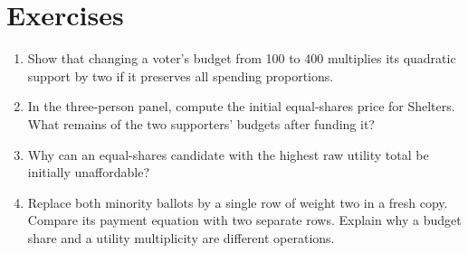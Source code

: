 \section{Exercises}
\begin{enumerate}
\item Show that changing a voter's budget from 100 to 400 multiplies its quadratic support by two if it preserves all spending proportions.
\item In the three-person panel, compute the initial equal-shares price for Shelters. What remains of the two supporters' budgets after funding it?
\item Why can an equal-shares candidate with the highest raw utility total be initially unaffordable?
\item Replace both minority ballots by a single row of weight two in a fresh copy. Compare its payment equation with two separate rows. Explain why a budget share and a utility multiplicity are different operations.
\end{enumerate}
